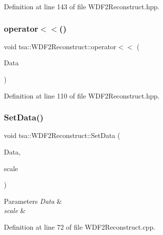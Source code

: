 Definition at line 143 of file W\+D\+F2\+Reconstruct.\+hpp.

\mbox{\label{classtsa_1_1_w_d_f2_reconstruct_aa3a0ac97f9c8726c62c7d4fe01cbb6d4}} 
\subsubsection{\texorpdfstring{operator$<$$<$()}{operator<<()}}
{\footnotesize\ttfamily void tsa\+::\+W\+D\+F2\+Reconstruct\+::operator$<$$<$ (\begin{DoxyParamCaption}\item[{\hyperlink{namespacetsa_ac599574bcc094eda25613724b8f3ca9e}{Seq\+View\+Double} \&}]{Data }\end{DoxyParamCaption})\hspace{0.3cm}{\ttfamily [inline]}}



Definition at line 110 of file W\+D\+F2\+Reconstruct.\+hpp.

\mbox{\label{classtsa_1_1_w_d_f2_reconstruct_a9cd78987651d392b4742f2f63df49e49}} 
\subsubsection{\texorpdfstring{Set\+Data()}{SetData()}}
{\footnotesize\ttfamily void tsa\+::\+W\+D\+F2\+Reconstruct\+::\+Set\+Data (\begin{DoxyParamCaption}\item[{\hyperlink{namespacetsa_ad260cd21c1891c4ed391fe788569aba4}{Dmatrix} \&}]{Data,  }\item[{double}]{scale }\end{DoxyParamCaption})}


\begin{DoxyParams}{Parameters}
{\em Data} & \\
\hline
{\em scale} & \\
\hline
\end{DoxyParams}


Definition at line 72 of file W\+D\+F2\+Reconstruct.\+cpp.



